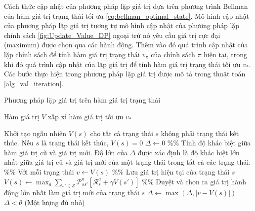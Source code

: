 Cách thức cập nhật của phương pháp lặp giá trị dựa trên phương trình Bellman của hàm giá trị trạng thái tối ưu \ref{eq:bellman_optimal_state}. Mô hình cập nhật của phương pháp lặp giá trị tương tự mô hình cập nhật của phương pháp lặp chính sách \ref{fig:Update_Value_DP} ngoại trừ nó yêu cầu giá trị cực đại (maximum) được chọn qua các hành động. Thêm vào đó quá trình cập nhật của lặp chính sách để tính hàm giá trị trạng thái $v_{\pi}$ của chính sách $\pi$ hiện tại, trong khi đó quá trình cập nhật của lặp giá trị để tính hàm giá trị trạng thái tối ưu $v_*$. Các bước thực hiện trong phương pháp lặp giá trị được mô tả trong thuật toán \ref{alg_val_iteration}.
\begin{algorithm}
	\caption{Phương pháp lặp giá trị trên hàm giá trị trạng thái}
	\label{alg_val_iteration}
	\begin{algorithmic}[1]
		\renewcommand{\algorithmicrequire}{\textbf{Đầu vào:}}
		\renewcommand{\algorithmicensure}{\textbf{Đầu ra:}}
		\algnewcommand{}
		\algnewcommand\Operation{\item[\algorithmicoperation]}
		
		\Require
		\Ensure Hàm giá trị $V$ xấp xỉ hàm giá trị tối ưu $v_{*}$
		
		\Operation
		\State Khởi tạo ngẫu nhiên $V(s)$ cho tất cả trạng thái $s$ không phải trạng thái kết thúc. Nếu $s$ là trạng thái kết thúc, $V(s) = 0$
		\Repeat
		\State $\Delta \leftarrow 0$ \%\% Tính độ khác biệt giữa hàm giá trị cũ và giá trị mới. Độ lớn của $\Delta$ được xác định là độ khác biệt lớn nhất giữa giá trị cũ và giá trị mới của một trạng thái trong tất cả các trạng thái.
		 \%\% Với mỗi trạng thái
		\State $v \leftarrow V(s)$ \%\% Lưu giá trị hiện tại của trạng thái $s$
		\State $V(s) \leftarrow \max_{a}\sum_{s' \in \mathcal{S}}\mathcal{P}_{ss'}^{a}\left[\mathcal{R}_{s}^{a} + \gamma V(s')\right]$ \%\% Duyệt và chọn ra giá trị hành động lớn nhất làm giá trị mới của trạng thái $s$
		\State $\Delta \leftarrow \max(\Delta,|v - V(s)|)$
		\EndFor
		\Until $\Delta < \theta$ (Một lượng đủ nhỏ)
	\end{algorithmic}
\end{algorithm}

